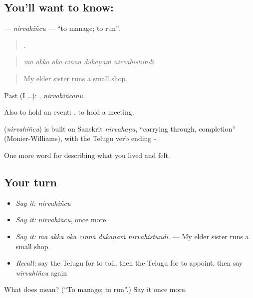 \subsection*{You'll want to know: }
\textbf{} — \emph{nirvahiñcu} — \textquotedblleft{}to manage; to run\textquotedblright{}.

\begin{quote}
     .
\end{quote}

\begin{quote}
\emph{mā akka oka cinna dukāṇaṁ nirvahistundi.}
\end{quote}

\begin{quote}
My elder sister runs a small shop.
\end{quote}

Past (I …): , \emph{nirvahiñcānu}.

Also to hold an event:  , to hold a meeting.

\begin{cousinweb}
\textbf{} (\emph{nirvahiñcu}) is built on Sanskrit \emph{nirvahaṇa}, \textquotedblleft{}carrying through, completion\textquotedblright{} (Monier-Williams), with the Telugu verb ending -.
\end{cousinweb}

\begin{grammarlens}[title={What you've built}]
One more word for describing what you lived and felt.
\end{grammarlens}

\subsection*{Your turn}
\begin{itemize}
\raggedright
  \item \emph{Say it:} \emph{nirvahiñcu}
  \item \emph{Say it:} \emph{nirvahiñcu}, once more
  \item \emph{Say it:} \emph{mā akka oka cinna dukāṇaṁ nirvahistundi.} — My elder sister runs a small shop.
  \item \emph{Recall:} say the Telugu for to toil, then the Telugu for to appoint, then say \emph{nirvahiñcu} again
\end{itemize}

\begin{tcolorbox}[breakable,colback=teal!4,colframe=teal!35!black,title={Before you move on}]
What does  mean? (\textquotedblleft{}To manage; to run\textquotedblright{}.) Say it once more.
\end{tcolorbox}

